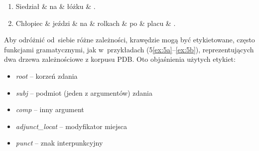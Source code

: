 \documentclass[licencjacka]{pracamgr_Kogni}
\begin{document}
    \begin{exe}
        \ex
        \begin{enumerate}[label=\alph{enumi}., ref=\alph{enumi}]
            \item
            {\begin{dependency}[theme=simple, segmented edge, baseline=5.2em, label style={font=\normalsize}]
                 \begin{deptext}[column sep=3em]
                     Siedział \& na \& łóżku \& .\\
                 \end{deptext}
            \end{dependency}
                \label{ex:5a}}
            \item{
                \begin{dependency}[theme=simple, segmented edge, baseline=5.2em, label style={font=\normalsize}]
                    \begin{deptext}[column sep=2em]
                        Chłopiec \& jeździ \& na \& rolkach \& po \& placu \& .\\
                    \end{deptext}
                \end{dependency}
                \label{ex:5b}}
        \end{enumerate}
        \label{ex:5}
    \end{exe}

    Aby odróżnić od~siebie różne zależności, krawędzie mogą być etykietowane, często funkcjami gramatycznymi, jak w~przykładach (5\ref{ex:5a}--\ref{ex:5b}), reprezentujących dwa drzewa zależnościowe z korpusu PDB. Oto objaśnienia użytych etykiet:
    \begin{itemize}
        \item \textit{root} -- korzeń zdania
        \item \textit{subj} -- podmiot (jeden z argumentów) zdania
        \item \textit{comp} -- inny argument
        \item \textit{adjunct\_locat} -- modyfikator miejsca
        \item \textit{punct} -- znak interpunkcyjny
    \end{itemize}
\end{document}
